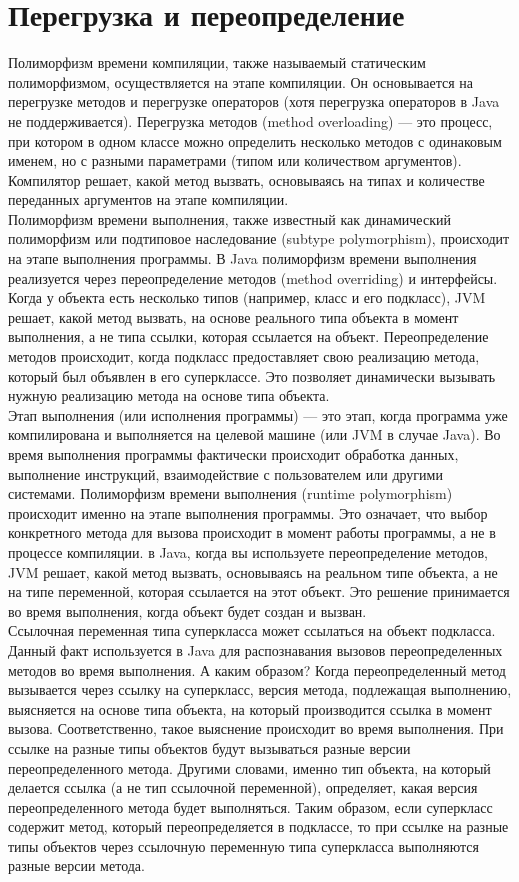 \section{Перегрузка и переопределение}
Полиморфизм времени компиляции, также называемый статическим полиморфизмом, осуществляется на этапе компиляции. Он основывается на перегрузке методов и перегрузке операторов (хотя перегрузка операторов в Java не поддерживается). Перегрузка методов (method overloading) — это процесс, при котором в одном классе можно определить несколько методов с одинаковым именем, но с разными параметрами (типом или количеством аргументов). Компилятор решает, какой метод вызвать, основываясь на типах и количестве переданных аргументов на этапе компиляции. \\
Полиморфизм времени выполнения, также известный как динамический полиморфизм или подтиповое наследование (subtype polymorphism), происходит на этапе выполнения программы. В Java полиморфизм времени выполнения реализуется через переопределение методов (method overriding) и интерфейсы. Когда у объекта есть несколько типов (например, класс и его подкласс), JVM решает, какой метод вызвать, на основе реального типа объекта в момент выполнения, а не типа ссылки, которая ссылается на объект. Переопределение методов происходит, когда подкласс предоставляет свою реализацию метода, который был объявлен в его суперклассе. Это позволяет динамически вызывать нужную реализацию метода на основе типа объекта.  \\
Этап выполнения (или исполнения программы) — это этап, когда программа уже компилирована и выполняется на целевой машине (или JVM в случае Java). Во время выполнения программы фактически происходит обработка данных, выполнение инструкций, взаимодействие с пользователем или другими системами. Полиморфизм времени выполнения (runtime polymorphism) происходит именно на этапе выполнения программы. Это означает, что выбор конкретного метода для вызова происходит в момент работы программы, а не в процессе компиляции. в Java, когда вы используете переопределение методов, JVM решает, какой метод вызвать, основываясь на реальном типе объекта, а не на типе переменной, которая ссылается на этот объект. Это решение принимается во время выполнения, когда объект будет создан и вызван. \\
Ссылочная переменная типа суперкласса может ссылаться на объект подкласса. Данный факт используется в Java для распознавания вызовов переопределенных методов во время выполнения. А каким образом? Когда переопределенный метод вызывается через ссылку на суперкласс, версия метода, подлежащая выполнению, выясняется на основе типа объекта, на который производится ссылка в момент вызова. Соответственно, такое выяснение происходит во время выполнения. При ссылке на разные типы объектов будут вызываться разные версии переопределенного метода. Другими словами, именно тип объекта, на который делается ссылка (а не тип ссылочной переменной), определяет, какая версия переопределенного метода будет выполняться. Таким образом, если суперкласс содержит метод, который переопределяется в подклассе, то при ссылке на разные типы объектов через ссылочную переменную типа суперкласса выполняются разные версии метода.
\\

